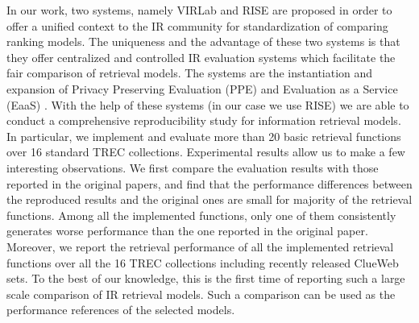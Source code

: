In our work, two systems, namely VIRLab \cite{Fang:2014:VWV:2600428.2611178} 
and RISE \cite{Yang:2016:RSI:2970398.2970415} are proposed in order to offer 
a unified context to the IR community for standardization of comparing 
ranking models. The uniqueness and the advantage of these two systems is 
that they offer centralized and controlled IR evaluation systems which 
facilitate the fair comparison of retrieval models. The systems are the 
instantiation and expansion of Privacy Preserving Evaluation (PPE) 
\cite{Fang:2014:VWV:2600428.2611178} 
and Evaluation as a Service (EaaS) \cite{rao:ecir:2015}. 
With the help of these systems (in our case we use RISE) 
we are able to conduct a comprehensive reproducibility study for information 
retrieval models. 
In particular, we implement and evaluate more than 20 basic retrieval 
functions over 16 standard TREC collections. Experimental results allow us to 
make a few interesting observations. We first compare the evaluation results 
with those reported in the original papers, and find that the performance 
differences between the reproduced results and the original ones are small 
for majority of the retrieval functions. Among all the implemented functions, 
only one of them consistently generates worse performance than the one 
reported in the original paper. Moreover, we report the retrieval 
performance of all the implemented retrieval functions over all the 16 
TREC collections including recently released ClueWeb sets. 
To the best of our knowledge, this is the first time of reporting such a 
large scale comparison of IR retrieval models. Such a comparison can be used 
as the performance references of the selected models.


